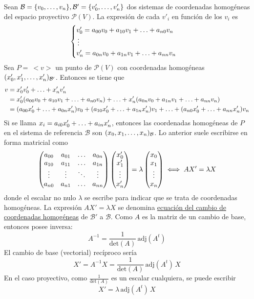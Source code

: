 \documentclass[12pt]{report}
\theoremstyle{definition}
\theoremstyle{definition}
\theoremstyle{remark}
\begin{document}
Sean $\mathcal{B} = \{v_0,\mathellipsis,v_n\}, \mathcal{B}' = \{v_0',\mathellipsis,v_n'\}$ dos sistemas de coordenadas homogéneas del espacio proyectivo $\mathcal{P}(V)$. La expresión de cada $v'_i$ en función de los $v_i$ es
\[
\begin{cases}
    v_0' = a_{00}v_0+a_{10}v_1+\mathellipsis+a_{n0}v_n \\
    \, \vdots \\
    v_n' = a_{0n}v_0+a_{1n}v_1+\mathellipsis+a_{nn}v_n
\end{cases}
\]
Sea $P = \ <v>$ un punto de $\mathcal{P}(V)$ con coordenadas homogéneas $(x_0',x_1',\mathellipsis,x_n')_{\mathcal{B}'}$. Entonces se tiene que
\[
\begin{aligned}[t]
v &= x_0'v_0'+\mathellipsis+x_n'v_n' \\
&= x_0'(a_{00}v_0+a_{10}v_1+\mathellipsis+a_{n0}v_n)+\mathellipsis+x_n'(a_{0n}v_0+a_{1n}v_1+\mathellipsis+a_{nn}v_n) \\
&= (a_{00}x_0'+\mathellipsis+a_{0n}x_n')v_0+(a_{10}x_0'+\mathellipsis+a_{1n}x_n')v_1+\mathellipsis+(a_{n0}x_0'+\mathellipsis+a_{nn}x_n')v_n
\end{aligned}
\]
Si se llama $x_i = a_{i0}x_0'+\mathellipsis+a_{in}x_n'$, entonces las coordenadas homogéneas de $P$ en el sistema de referencia $\mathcal{B}$ son $(x_0,x_1,\mathellipsis,x_n)_{\mathcal{B}}$. Lo anterior suele escribirse en forma matricial como
\[\begin{pmatrix*}
    a_{00} & a_{01} & \mathellipsis & a_{0n} \\
    a_{10} & a_{11} & \mathellipsis & a_{1n} \\
    \vdots & \vdots & \ddots & \vdots \\
    a_{n0} & a_{n1} & \mathellipsis & a_{nn}
\end{pmatrix*}
\begin{pmatrix*}
    x_0' \\
    x_1' \\
    \vdots \\
    x_n'
\end{pmatrix*} = \lambda \begin{pmatrix*}
    x_0 \\
    x_1 \\
    \vdots \\
    x_n
\end{pmatrix*} \iff
AX' = \lambda X
\]
donde el escalar no nulo $\lambda$ se escribe para indicar que se trata de coordenadas homogéneas. La expresión $AX' = \lambda X$ se denomina \ul{ecuación del cambio de coordenadas homogéneas} de $\mathcal{B'}$ a $\mathcal{B}$. Como $A$ es la matriz de un cambio de base, entonces posee inversa:
\[A^{-1} = \frac{1}{\mathrm{det}(A)} \, \mathrm{adj}(A^t)\]
El cambio de base (vectorial) recíproco sería
\[X' = A^{-1}X = \frac{1}{\mathrm{det}(A)} \, \mathrm{adj}(A^t) \, X\]
En el caso proyectivo, como $\frac{1}{\mathrm{det}(A)}$ es un escalar cualquiera, se puede escribir
\[X' = \lambda \, \mathrm{adj}(A^t) \, X\]
\end{document}
